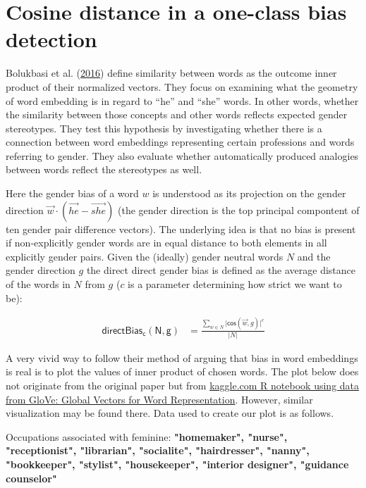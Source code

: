 \documentclass[12pt,]{book}
\begin{document}
\section{Cosine distance in a one-class bias
detection}\label{cosine-distance-in-a-one-class-bias-detection}

Bolukbasi et al. (\protect\hyperlink{ref-Bolukbasi2016Man}{2016}) define
similarity between words as the outcome inner product of their
normalized vectors. They focus on examining what the geometry of word
embedding is in regard to ``he'' and ``she'' words. In other words,
whether the similarity between those concepts and other words reflects
expected gender stereotypes. They test this hypothesis by investigating
whether there is a connection between word embeddings representing
certain professions and words referring to gender. They also evaluate
whether automatically produced analogies between words reflect the
stereotypes as well.

Here the gender bias of a word \(w\) is understood as its projection on
the gender direction
\(\vec{w} \cdot (\overrightarrow{he} - \overrightarrow{she})\) (the
gender direction is the top principal compontent of ten gender pair
difference vectors). The underlying idea is that no bias is present if
non-explicitly gender words are in equal distance to both elements in
all explicitly gender pairs. Given the (ideally) gender neutral words
\(N\) and the gender direction \(g\) the direct direct gender bias is
defined as the average distance of the words in \(N\) from \(g\) (\(c\)
is a parameter determining how strict we want to be):

\begin{align}
\mathsf{directBias_c(N,g)} & = \frac{\sum_{w\in N}\vert \mathsf{cos}(\vec{w},g)\vert^c}{\vert N \vert }
\end{align}

A very vivid way to follow their method of arguing that bias in word
embeddings is real is to plot the values of inner product of chosen
words. The plot below does not originate from the original paper but
from
\href{https://www.kaggle.com/rtatman/gender-bias-in-word-embeddings}{kaggle.com
R notebook using data from GloVe: Global Vectors for Word
Representation}. However, similar visualization may be found there. Data
used to create our plot is as follows.

Occupations associated with feminine:
\textbf{"homemaker", "nurse", "receptionist", "librarian", "socialite", "hairdresser", "nanny", "bookkeeper", "stylist", "housekeeper", "interior designer", "guidance counselor"}
\end{document}
